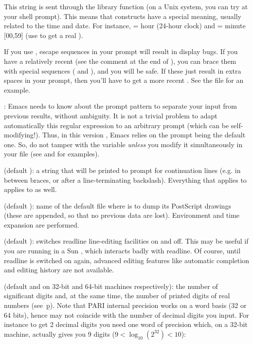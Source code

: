 This string is sent through the library function  (on a
Unix system, you can try  at your shell prompt). This means
that \kbd{\%} constructs have a special meaning, usually related to the time
and date. For instance,  = hour (24-hour clock) and  =
minute [00,59] (use \kbd{\%\%} to get a real \kbd{\%}).

If you use , escape sequences in your prompt will result in
display bugs. If you have a relatively recent  (see the comment
at the end of ), you can brace them with special sequences
(\kbd{\bs[} and \kbd{\bs]}), and you will be safe. If these just result in
extra spaces in your prompt, then you'll have to get a more recent
. See the file  for an example.

: Emacs needs to know about the prompt pattern to
separate your input from previous  results, without ambiguity. It is
not a trivial problem to adapt automatically this regular expression to an
arbitrary prompt (which can be self-modifying!). Thus, in this version \vers,
Emacs relies on the prompt being the default one. So, do not tamper with the
 variable \emph{unless} you modify it simultaneously in your
 file (see  and  for
examples).

 (default ): a string that will be printed
to prompt for continuation lines (e.g. in between braces, or after a
line-terminating backslash). Everything that applies to 
applies to  as well.

 (default ): name of the default file where
 is to dump its PostScript drawings (these are appended, so that no
previous data are lost). Environment and time expansion are performed.

 (default ): switches readline line-editing
facilities on and off. This may be useful if you are running  in a Sun
, which interacts badly with readline. Of course, until readline
is switched on again, advanced editing features like automatic completion
and editing history are not available.

 (default  and  on 32-bit and 64-bit machines respectively): the number of significant digits and, at the same
time, the number of printed digits of real numbers (see~\b{p}). Note that
PARI internal precision works on a word basis (32 or 64 bits), hence may not
coincide with the number of decimal digits you input. For instance to get 2
decimal digits you need one word of precision which, on a 32-bit machine,
actually gives you 9 digits ($9 < \log_{10}(2^{32}) < 10$):


